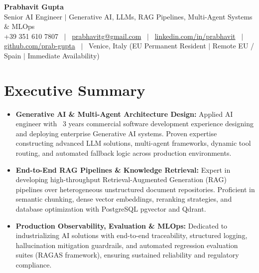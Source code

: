 \documentclass[a4paper,10pt]{article}
\begin{document}
\begin{minipage}[c]{0.80\textwidth}
  {\Huge\bfseries Prabhavit Gupta}\\[3pt]
  {\color{accent}\large Senior AI Engineer $\vert$ Generative AI, LLMs, RAG Pipelines, Multi-Agent Systems $\&$ MLOps}\\[6pt]
  {\footnotesize +39 351 610 7807 ~$\vert$~
  \href{mailto:prabhavitg@gmail.com}{prabhavitg@gmail.com} ~$\vert$~
  \href{https://www.linkedin.com/in/prabhavit/}{linkedin.com/in/prabhavit} ~$\vert$~
  \href{https://github.com/prab-gupta}{github.com/prab-gupta} ~$\vert$~
  Venice, Italy (EU Permanent Resident $\vert$ Remote EU / Spain $\vert$ Immediate Availability)}
\end{minipage}\hfill

\vspace{6pt}

\section{Executive Summary}
\begin{itemize}
  \item \textbf{Generative AI \& Multi-Agent Architecture Design:} Applied AI engineer with ~3 years commercial software development experience designing and deploying enterprise Generative AI systems. Proven expertise constructing advanced LLM solutions, multi-agent frameworks, dynamic tool routing, and automated fallback logic across production environments.
  \item \textbf{End-to-End RAG Pipelines \& Knowledge Retrieval:} Expert in developing high-throughput Retrieval-Augmented Generation (RAG) pipelines over heterogeneous unstructured document repositories. Proficient in semantic chunking, dense vector embeddings, reranking strategies, and database optimization with PostgreSQL pgvector and Qdrant.
  \item \textbf{Production Observability, Evaluation \& MLOps:} Dedicated to industrializing AI solutions with end-to-end traceability, structured logging, hallucination mitigation guardrails, and automated regression evaluation suites (RAGAS framework), ensuring sustained reliability and regulatory compliance.
\end{itemize}

\end{document}
